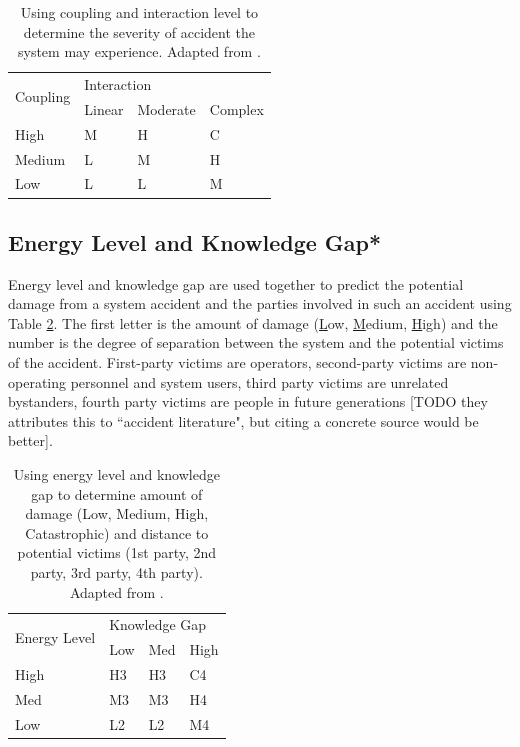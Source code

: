 \documentclass[11pt]{article}
\begin{document}
\begin{table}[h]
\centering
\begin{tabular}{|l|l|l|l|}
\hline
\multirow{2}{*}{Coupling} & \multicolumn{3}{l|}{Interaction} \\ \cline{2-4}
        & Linear & Moderate & Complex \\ \hline
High    & M      & H        & C       \\ \hline
Medium  & L      & M        & H       \\ \hline
Low     & L      & L        & M       \\ \hline
\end{tabular}
\caption{Using coupling and interaction level to determine the severity of accident the system may
    experience. Adapted from \cite{shrivastava2009normal}.}
\label{tab:nat}
\end{table}

\subsection{Energy Level and Knowledge Gap*}

Energy level and knowledge gap are used together to predict the potential damage from a system
accident and the parties involved in such an accident using Table \ref{tab:nat2}. The first letter
is the amount of damage (\underline{L}ow, \underline{M}edium, \underline{H}igh) and the number is
the degree of separation between the system and the potential victims of the accident. First-party
victims are operators, second-party victims are non-operating personnel and system users, third
party victims are unrelated bystanders, fourth party victims are people in future generations
\cite{shrivastava2009normal} [TODO they attributes this to ``accident literature", but citing a
concrete source would be better].

\begin{table}[h]
\centering
\begin{tabular}{|l|l|l|l|}
\hline
\multirow{2}{*}{Energy Level} & \multicolumn{3}{l|}{Knowledge Gap} \\ \cline{2-4}
     & Low & Med & High \\ \hline
High & H3  & H3  & C4   \\ \hline
Med  & M3  & M3  & H4   \\ \hline
Low  & L2  & L2  & M4   \\ \hline
\end{tabular}
\caption{Using energy level and knowledge gap to determine amount of damage (Low, Medium, High,
Catastrophic) and distance to potential victims (1st party, 2nd party, 3rd party, 4th party).
Adapted from \cite{shrivastava2009normal}.}
\label{tab:nat2}
\end{table}
\end{document}
